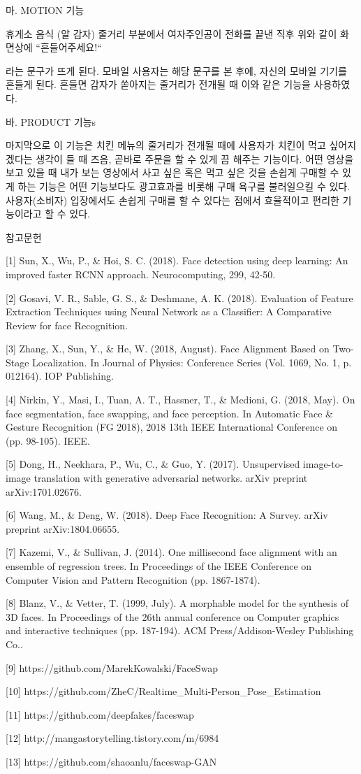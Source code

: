 \documentclass{oblivoir}
\begin{document}
마. MOTION 기능

                                          휴게소 음식 (알 감자) 줄거리 부분에서 여자주인공이 전화를 끝낸 직후 위와 같이 화면상에 “흔들어주세요!“

라는 문구가 뜨게 된다. 모바일 사용자는 해당 문구를 본 후에, 자신의 모바일 기기를 흔들게 된다. 흔들면 감자가 쏟아지는 줄거리가 전개될 때 이와 같은 기능을 사용하였다.

바. PRODUCT 기능s

마지막으로 이 기능은 치킨 메뉴의 줄거리가 전개될 때에 사용자가 치킨이 먹고 싶어지겠다는 생각이 들 때 즈음, 곧바로 주문을 할 수 있게 끔 해주는 기능이다. 어떤 영상을 보고 있을 때 내가 보는 영상에서 사고 싶은 혹은 먹고 싶은 것을 손쉽게 구매할 수 있게 하는 기능은 어떤 기능보다도 광고효과를 비롯해 구매 욕구를 불러일으킬 수 있다. 사용자(소비자) 입장에서도 손쉽게 구매를 할 수 있다는 점에서 효율적이고 편리한 기능이라고 할 수 있다.

참고문헌

[1] Sun, X., Wu, P., \& Hoi, S. C. (2018). Face detection using deep learning: An improved faster RCNN approach. Neurocomputing, 299, 42-50.

[2] Gosavi, V. R., Sable, G. S., \& Deshmane, A. K. (2018). Evaluation of Feature Extraction Techniques using Neural Network as a Classifier: A Comparative Review for face Recognition.

[3] Zhang, X., Sun, Y., \& He, W. (2018, August). Face Alignment Based on Two-Stage Localization. In Journal of Physics: Conference Series (Vol. 1069, No. 1, p. 012164). IOP Publishing.

[4] Nirkin, Y., Masi, I., Tuan, A. T., Hassner, T., \& Medioni, G. (2018, May). On face segmentation, face swapping, and face perception. In Automatic Face \& Gesture Recognition (FG 2018), 2018 13th IEEE International Conference on (pp. 98-105). IEEE.

[5] Dong, H., Neekhara, P., Wu, C., \& Guo, Y. (2017). Unsupervised image-to-image translation with generative adversarial networks. arXiv preprint arXiv:1701.02676.

[6] Wang, M., \& Deng, W. (2018). Deep Face Recognition: A Survey. arXiv preprint arXiv:1804.06655.

[7] Kazemi, V., \& Sullivan, J. (2014). One millisecond face alignment with an ensemble of regression trees. In Proceedings of the IEEE Conference on Computer Vision and Pattern Recognition (pp. 1867-1874).

[8] Blanz, V., \& Vetter, T. (1999, July). A morphable model for the synthesis of 3D faces. In Proceedings of the 26th annual conference on Computer graphics and interactive techniques (pp. 187-194). ACM Press/Addison-Wesley Publishing Co..

[9] https://github.com/MarekKowalski/FaceSwap

[10] https://github.com/ZheC/Realtime_Multi-Person_Pose_Estimation

[11] https://github.com/deepfakes/faceswap

[12] http://mangastorytelling.tistory.com/m/6984

[13] https://github.com/shaoanlu/faceswap-GAN
\end{document}
